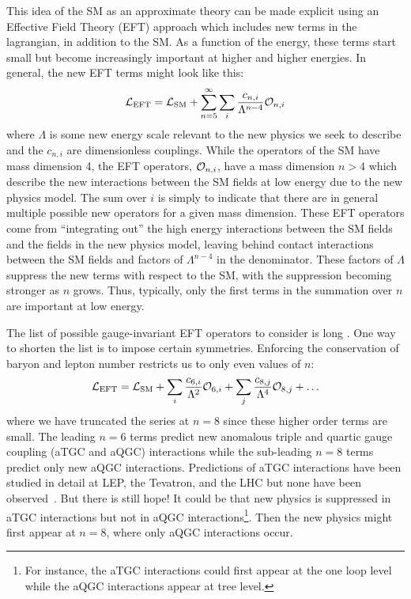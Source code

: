 This idea of the SM as an approximate theory
can be made explicit 
using an Effective Field Theory (EFT) \cite{Degrande:2012wf}
approach which includes new terms in the lagrangian, in addition to the SM.
As a function of the energy, these terms start small 
but become increasingly important at higher and higher energies.
In general, the new EFT terms might look like this:
\begin{equation}
\mathcal{L}_{\textrm{EFT}} = \mathcal{L}_{\textrm{SM}} + \sum_{n=5}^{\infty} \sum_i \frac{c_{n,i}}{\Lambda^{n-4}} \mathcal{O}_{n,i}
\label{eq:lagrangian_eft_gen}
\end{equation}
where $\Lambda$ is some new energy scale relevant to the new
physics we seek to describe and the $c_{n,i}$ are dimensionless
couplings.  While the operators of the SM have mass dimension 4, the EFT 
operators, $\mathcal{O}_{n,i}$, have a mass dimension
$n>4$ which describe the new interactions between the SM fields at low energy
due to the new physics model.
The sum over $i$ is simply to indicate that there are in general multiple 
possible new operators for a given mass dimension.
These EFT operators come from ``integrating out'' the high energy interactions
between the SM fields and the fields in the new physics model,
leaving behind contact interactions between the SM fields and factors
of $\Lambda^{n-4}$ in the denominator.
These factors of $\Lambda$ suppress the new terms
with respect to the SM, with the suppression becoming stronger as $n$ grows.
Thus, typically, only the first terms in the summation
over $n$ are important at low energy.

The list of possible gauge-invariant EFT operators to 
consider is long \cite{Hagiwara:1993ck,Buchmuller:1985jz,Eboli:2006wa}.
One way to shorten the list is to impose certain symmetries. 
Enforcing the conservation
of baryon and lepton number restricts 
us to only even values of $n$:
\begin{equation}
\curlyl_{\textrm{EFT}} = \curlyl_{\textrm{SM}} + \sum_i \frac{c_{6,i}}{\Lambda^2} \curlyo_{6,i} + \sum_j \frac{c_{8,j}}{\Lambda^4} \curlyo_{8,j} + \dots
\label{eq:lagrangian_eft}
\end{equation}
where we have truncated the series at $n=8$ since 
these higher order terms are small.
The leading $n=6$ terms predict new anomalous triple and quartic 
gauge coupling (aTGC and aQGC) interactions while the sub-leading $n=8$ terms
predict only new aQGC interactions. 
Predictions of aTGC interactions have been studied in detail at 
LEP, the Tevatron, and the LHC  but none have been observed~\cite{PDG:2014}.
But there is still hope!
It could be that new physics is suppressed in aTGC interactions
but not in aQGC interactions\footnote{For instance, the aTGC interactions
could first appear at the one loop level while the aQGC 
interactions appear at tree level.}.
Then the new physics might first appear at $n=8$, where only aQGC interactions
occur.



